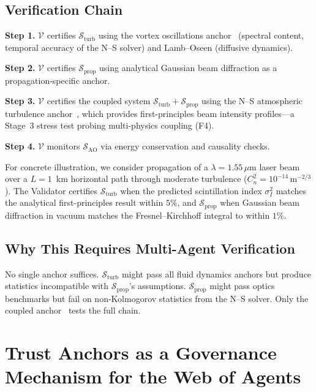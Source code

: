 \documentclass[conference]{IEEEtran}
\begin{document}
\subsection{Verification Chain}

\textbf{Step 1.} $\mathcal{V}$ certifies $\mathcal{S}_{\mathrm{turb}}$ using the vortex oscillations anchor~\cite{PetrovaShugaev2012} (spectral content, temporal accuracy of the N--S solver) and Lamb--Oseen (diffusive dynamics).

\textbf{Step 2.} $\mathcal{V}$ certifies $\mathcal{S}_{\mathrm{prop}}$ using analytical Gaussian beam diffraction as a propagation-specific anchor.

\textbf{Step 3.} $\mathcal{V}$ certifies the coupled system $\mathcal{S}_{\mathrm{turb}} + \mathcal{S}_{\mathrm{prop}}$ using the N--S atmospheric turbulence anchor~\cite{Shugaev2009}, which provides first-principles beam intensity profiles---a Stage~3 stress test probing multi-physics coupling (F4).

\textbf{Step 4.} $\mathcal{V}$ monitors $\mathcal{S}_{\mathrm{AO}}$ via energy conservation and causality checks.

For concrete illustration, we consider propagation of a $\lambda = 1.55\,\mu$m laser beam over a $L = 1$~km horizontal path through moderate turbulence ($C_n^2 = 10^{-14}\,\mathrm{m}^{-2/3}$). The Validator certifies $\mathcal{S}_{\mathrm{turb}}$ when the predicted scintillation index $\sigma_I^2$ matches the analytical first-principles result within $5\%$, and $\mathcal{S}_{\mathrm{prop}}$ when Gaussian beam diffraction in vacuum matches the Fresnel--Kirchhoff integral to within $1\%$.

\subsection{Why This Requires Multi-Agent Verification}

No single anchor suffices. $\mathcal{S}_{\mathrm{turb}}$ might pass all fluid dynamics anchors but produce statistics incompatible with $\mathcal{S}_{\mathrm{prop}}$'s assumptions. $\mathcal{S}_{\mathrm{prop}}$ might pass optics benchmarks but fail on non-Kolmogorov statistics from the N--S solver. Only the coupled anchor~\cite{Shugaev2009} tests the full chain.


\section{Trust Anchors as a Governance Mechanism for the Web of Agents}
\end{document}
